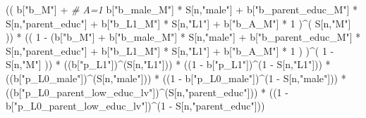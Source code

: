\documentclass[
]{book}
\newenvironment{Shaded}{\begin{snugshade}}{\end{snugshade}}
\newcommand{\CommentTok}[1]{\textcolor[rgb]{0.56,0.35,0.01}{\textit{#1}}}
\newcommand{\DecValTok}[1]{\textcolor[rgb]{0.00,0.00,0.81}{#1}}
\newcommand{\NormalTok}[1]{#1}
\newcommand{\SpecialCharTok}[1]{\textcolor[rgb]{0.00,0.00,0.00}{#1}}
\newcommand{\StringTok}[1]{\textcolor[rgb]{0.31,0.60,0.02}{#1}}
\begin{document}
\begin{Shaded}
\begin{Highlighting}[]
\NormalTok{      (( b[}\StringTok{"b\_M"}\NormalTok{] }\SpecialCharTok{+}                                                             \CommentTok{\# A\textquotesingle{}=1}
\NormalTok{           b[}\StringTok{"b\_male\_M"}\NormalTok{] }\SpecialCharTok{*}\NormalTok{ S[n,}\StringTok{"male"}\NormalTok{] }\SpecialCharTok{+} 
\NormalTok{           b[}\StringTok{"b\_parent\_educ\_M"}\NormalTok{] }\SpecialCharTok{*}\NormalTok{ S[n,}\StringTok{"parent\_educ"}\NormalTok{] }\SpecialCharTok{+} 
\NormalTok{           b[}\StringTok{"b\_L1\_M"}\NormalTok{] }\SpecialCharTok{*}\NormalTok{ S[n,}\StringTok{"L1"}\NormalTok{] }\SpecialCharTok{+}
\NormalTok{           b[}\StringTok{"b\_A\_M"}\NormalTok{] }\SpecialCharTok{*} \DecValTok{1}\NormalTok{ )}\SpecialCharTok{\^{}}\NormalTok{( S[n,}\StringTok{"M"}\NormalTok{] )) }\SpecialCharTok{*}
\NormalTok{      (( }\DecValTok{1} \SpecialCharTok{{-}}\NormalTok{ (b[}\StringTok{"b\_M"}\NormalTok{] }\SpecialCharTok{+} 
\NormalTok{                b[}\StringTok{"b\_male\_M"}\NormalTok{] }\SpecialCharTok{*}\NormalTok{ S[n,}\StringTok{"male"}\NormalTok{] }\SpecialCharTok{+} 
\NormalTok{                b[}\StringTok{"b\_parent\_educ\_M"}\NormalTok{] }\SpecialCharTok{*}\NormalTok{ S[n,}\StringTok{"parent\_educ"}\NormalTok{] }\SpecialCharTok{+} 
\NormalTok{                b[}\StringTok{"b\_L1\_M"}\NormalTok{] }\SpecialCharTok{*}\NormalTok{ S[n,}\StringTok{"L1"}\NormalTok{] }\SpecialCharTok{+}
\NormalTok{                b[}\StringTok{"b\_A\_M"}\NormalTok{] }\SpecialCharTok{*} \DecValTok{1}\NormalTok{ ) )}\SpecialCharTok{\^{}}\NormalTok{( }\DecValTok{1} \SpecialCharTok{{-}}\NormalTok{ S[n,}\StringTok{"M"}\NormalTok{] )) }\SpecialCharTok{*}
\NormalTok{      ((b[}\StringTok{"p\_L1"}\NormalTok{])}\SpecialCharTok{\^{}}\NormalTok{(S[n,}\StringTok{"L1"}\NormalTok{])) }\SpecialCharTok{*}
\NormalTok{      ((}\DecValTok{1} \SpecialCharTok{{-}}\NormalTok{ b[}\StringTok{"p\_L1"}\NormalTok{])}\SpecialCharTok{\^{}}\NormalTok{(}\DecValTok{1} \SpecialCharTok{{-}}\NormalTok{ S[n,}\StringTok{"L1"}\NormalTok{])) }\SpecialCharTok{*}
\NormalTok{      ((b[}\StringTok{"p\_L0\_male"}\NormalTok{])}\SpecialCharTok{\^{}}\NormalTok{(S[n,}\StringTok{"male"}\NormalTok{])) }\SpecialCharTok{*} 
\NormalTok{      ((}\DecValTok{1} \SpecialCharTok{{-}}\NormalTok{ b[}\StringTok{"p\_L0\_male"}\NormalTok{])}\SpecialCharTok{\^{}}\NormalTok{(}\DecValTok{1} \SpecialCharTok{{-}}\NormalTok{ S[n,}\StringTok{"male"}\NormalTok{])) }\SpecialCharTok{*} 
\NormalTok{      ((b[}\StringTok{"p\_L0\_parent\_low\_educ\_lv"}\NormalTok{])}\SpecialCharTok{\^{}}\NormalTok{(S[n,}\StringTok{"parent\_educ"}\NormalTok{])) }\SpecialCharTok{*}
\NormalTok{      ((}\DecValTok{1} \SpecialCharTok{{-}}\NormalTok{ b[}\StringTok{"p\_L0\_parent\_low\_educ\_lv"}\NormalTok{])}\SpecialCharTok{\^{}}\NormalTok{(}\DecValTok{1} \SpecialCharTok{{-}}\NormalTok{ S[n,}\StringTok{"parent\_educ"}\NormalTok{])) }
    

\end{Highlighting}
\end{Shaded}
\end{document}
